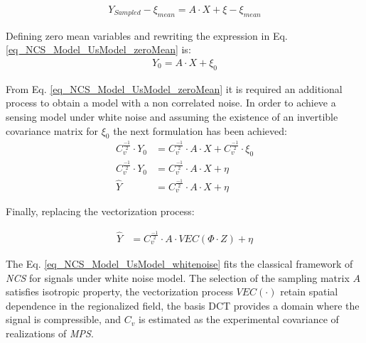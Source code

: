 	\begin{align}
			Y_{Sampled} - \xi_{mean} = A \cdot X + \xi - \xi_{mean}
			\label{eq_NCS_Model_UsModel_zeroMean_Full}
\end{align}

Defining zero mean variables and rewriting the expression in Eq. \eqref{eq_NCS_Model_UsModel_zeroMean} is: \\

\begin{align}
			Y_{0} = A \cdot X + \xi_{0}
			\label{eq_NCS_Model_UsModel_zeroMean}
\end{align}
					
From Eq. \eqref{eq_NCS_Model_UsModel_zeroMean} it is required an additional process to obtain a model with a non correlated noise. In order to achieve a sensing model under white noise and assuming the existence of an invertible covariance matrix for $\xi_{0}$ the next formulation has been achieved: \\

	\begin{align}
			C_{v}^{\frac{-1}{2}} \cdot Y_{0} & = C_{v}^{\frac{-1}{2}} \cdot A \cdot X + C_{v}^{\frac{-1}{2}} \cdot \xi_{0} \\
			C_{v}^{\frac{-1}{2}} \cdot Y_{0} & = C_{v}^{\frac{-1}{2}} \cdot A \cdot X + \eta  \\
			\widehat{Y} & = C_{v}^{\frac{-1}{2}} \cdot A \cdot X + \eta	
			\label{eq_NCS_Model_UsModel_whitenoise_Generic}
\end{align}						

Finally, replacing the vectorization process:

	\begin{align}
			\widehat{Y} & = C_{v}^{\frac{-1}{2}} \cdot A \cdot VEC(\Phi \cdot Z) + \eta 	
			\label{eq_NCS_Model_UsModel_whitenoise}
\end{align}						

	
The Eq. \eqref{eq_NCS_Model_UsModel_whitenoise} fits the classical framework of \emph{NCS} for signals under white noise model. The selection of the sampling matrix $A$ satisfies isotropic property, the vectorization process $VEC(\cdot)$ retain spatial dependence in the regionalized field, the basis DCT provides a domain where the signal is compressible, and $C_{v}$ is estimated as the experimental covariance of realizations of \emph{MPS}.































